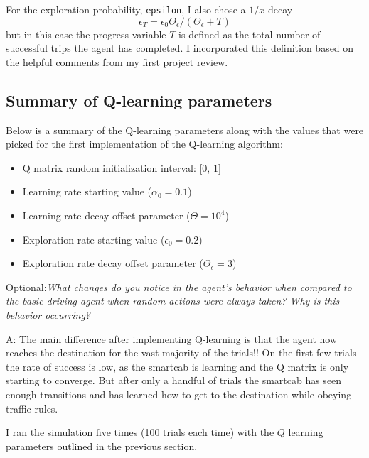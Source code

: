 \documentclass[conference]{IEEEtran}
\begin{document}
For the exploration probability, \verb"epsilon", I also chose a $1/x$
decay
\begin{equation}
    \epsilon_{T} = \epsilon_{0} \Theta_{\epsilon} / (\Theta_{\epsilon} + T)
\end{equation}
but in this case the progress variable $T$ is defined as the total number
of successful trips the agent has completed.  I incorporated this definition
based on the helpful comments from my first project review.


\subsection{Summary of Q-learning parameters}

Below is a summary of the Q-learning parameters along with the values that
were picked for the first implementation of the Q-learning algorithm:

\begin{itemize}
\item Q matrix random initialization interval: [0, 1]

\item Learning rate starting value ($\alpha_{0}=0.1$)

\item Learning rate decay offset parameter ($\Theta=10^{4}$)

\item Exploration rate starting value ($\epsilon_{0}=0.2$)

\item Exploration rate decay offset parameter ($\Theta_{\epsilon}=3$)
\end{itemize}

\vspace{1em} \noindent Optional:\textit{What changes do you notice in the
agent's behavior when compared to the basic driving agent when random actions
were always taken? Why is this behavior occurring?}

\vspace{2em} \noindent A: The main difference after implementing Q-learning is
that the agent now reaches the destination for the vast majority of the
trials!!  On the first few trials the rate of success is low, as the smartcab
is learning and the Q matrix is only starting to converge. But after only a
handful of trials the smartcab has seen enough transitions and has learned how
to get to the destination while obeying traffic rules. 

I ran the simulation five times (100 trials each time) with the $Q$ learning
parameters outlined in the previous section. 
\end{document}
